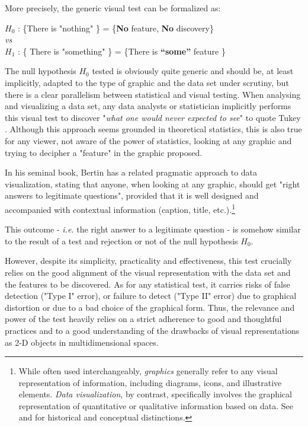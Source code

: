 \documentclass[11pt,twoside,a4paper]{article}
\begin{document}
More precisely, the generic visual test can be formalized as:
\begin{center}
  $H_0$ : \{There is "nothing"  \} = \{\textbf{No} feature, \textbf{No} discovery\} \\
 \emph{vs}\\
  $H_1$ : \{ There is "something" \} = \{There is \textbf{``some''} feature \}
\end{center}

The null hypothesis $H_0$ tested is obviously quite generic and should be, at least implicitly, adapted to  the type of graphic and the data set under scrutiny, but there is a clear parallelism between statistical and visual testing. When analysing and visualizing a data set, any data analysts or statistician implicitly performs this visual test to discover "\textit{what one would never expected to see}" to quote Tukey \citep{tukey1977exploratory}. Although this approach seems grounded in theoretical statistics, this is also true for any viewer, not aware of the power of statistics, looking at any graphic and trying to decipher a "feature" in the graphic proposed.

In his seminal book, Bertin \citep{Bertin1983English}  has a related pragmatic approach to data visualization, stating that anyone, when looking at any graphic, should get "right answers  to legitimate questions",  provided that it is well designed and accompanied with contextual information (caption, title, etc.).\footnote{While often used interchangeably, \emph{graphics} generally refer to any visual representation of information, including diagrams, icons, and illustrative elements. \emph{Data visualization}, by contrast, specifically involves the graphical representation of quantitative or qualitative information based on data. See \citep{Friendly2008} and \citep{Cairo2012} for historical and conceptual distinctions.}

This outcome - \textit{i.e.} the right answer to a legitimate question - is somehow similar to the result of a test and rejection or not of the null hypothesis $H_0$.


However, despite its simplicity, practicality and effectiveness, this test crucially relies on the good alignment of the visual representation with the data set and the features to be discovered. As for any  statistical test, it carries risks of false detection ("Type I" error), or  failure to detect ("Type II" error) due to graphical distortion or due to a bad choice of the graphical form. Thus, the  relevance and power of the test heavily relies on a strict adherence to good and thoughtful practices and to a good understanding of the drawbacks of visual representations as 2-D objects in multidimensional spaces.
\end{document}
